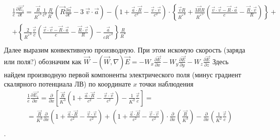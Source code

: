 \documentclass[11pt]{article}
\begin{document}
\[\begin{align}
  & \frac{1}{e}\frac{\partial \overrightarrow{{{E}_{1}}}}{\partial t}=\frac{\overrightarrow{R}}{{{R}^{*}}^{3}}\frac{1}{{{c}^{2}}}\frac{R}{{{R}^{*}}}\left( \overrightarrow{R}\frac{\partial \overrightarrow{a}}{\partial t'}-3\ \overrightarrow{v}\cdot \overrightarrow{a} \right)-\left( 1+\frac{\overrightarrow{a}\cdot \overrightarrow{R}}{{{c}^{2}}}-\frac{\overrightarrow{v}\cdot \overrightarrow{v}}{{{c}^{2}}} \right)\cdot \left\{ \frac{\overrightarrow{v}R}{{{R}^{*}}^{4}}+\frac{3\overrightarrow{R}R}{{{R}^{*}}^{5}}\left( \frac{\overrightarrow{v}\cdot \overrightarrow{v}-\overrightarrow{R}\cdot \overrightarrow{a}}{c}-\frac{\overrightarrow{R}\cdot \overrightarrow{v}}{R} \right) \right\}+ \\ 
 & +\left\{ \frac{2}{{{R}^{*}}^{3}}\frac{\overrightarrow{v}}{c}\left( \frac{\overrightarrow{v}\cdot \overrightarrow{v}-\overrightarrow{R}\cdot \overrightarrow{a}}{c}-\frac{\overrightarrow{R}\cdot \overrightarrow{v}}{R} \right)-\frac{\overrightarrow{a}}{c{{R}^{*}}^{2}} \right\}\frac{R}{{{R}^{*}}} \\ 
\end{align}\] Далее выразим конвективную производную. При этом искомую
скорость (заряда или поля?) обозначим как \(\overrightarrow{W}\)
\(-\left( \overrightarrow{W},\nabla \right)\overrightarrow{E}=-{{W}_{x}}\frac{\partial \overrightarrow{E}}{\partial x}-{{W}_{y}}\frac{\partial \overrightarrow{E}}{\partial y}-{{W}_{z}}\frac{\partial \overrightarrow{E}}{\partial z}\)
Здесь найдем производную первой компоненты электрического поля (минус
градиент скалярного потенциала ЛВ) по координате \(x\) точки наблюдения
\[\begin{align}
  & \frac{1}{e}\frac{\partial \overrightarrow{{{E}_{1}}}}{\partial x}=\frac{\partial }{\partial x}\left[ \frac{\overrightarrow{R}}{{{K}^{3}}}\left( 1+\frac{\overrightarrow{a}\cdot \overrightarrow{R}}{{{c}^{2}}}-\frac{\overrightarrow{v}\cdot \overrightarrow{v}}{{{c}^{2}}} \right)-\frac{1}{{{K}^{2}}}\frac{\overrightarrow{v}}{c} \right]= \\ 
 & =\frac{\overrightarrow{R}}{{{K}^{3}}}\frac{\partial }{\partial x}\left( 1+\frac{\overrightarrow{a}\cdot \overrightarrow{R}}{{{c}^{2}}}-\frac{\overrightarrow{v}\cdot \overrightarrow{v}}{{{c}^{2}}} \right)+\left( 1+\frac{\overrightarrow{a}\cdot \overrightarrow{R}}{{{c}^{2}}}-\frac{\overrightarrow{v}\cdot \overrightarrow{v}}{{{c}^{2}}} \right)\cdot \frac{\partial }{\partial x}\left( \frac{\overrightarrow{R}}{{{K}^{3}}} \right)-\frac{\partial }{\partial x}\left( \frac{1}{{{K}^{2}}}\frac{\overrightarrow{v}}{c} \right) \\ 
\end{align}\].
\end{document}
